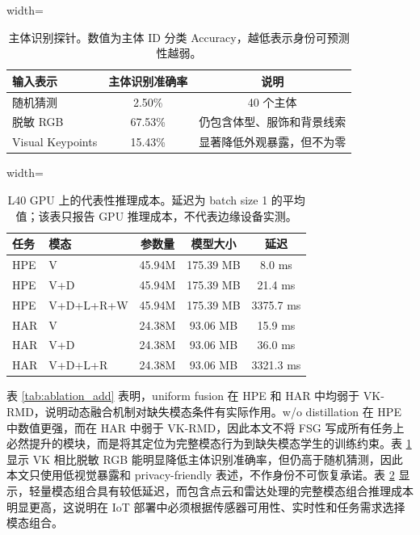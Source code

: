 \documentclass[journal]{IEEEtran}
\begin{document}
\begin{table}[!t]
\centering
\caption{主体识别探针。数值为主体 ID 分类 Accuracy，越低表示身份可预测性越弱。}
\label{tab:privacy_add}
\scriptsize
\begin{adjustbox}{width=\linewidth}
\begin{tabular}{lcc}
\toprule
输入表示 & 主体识别准确率 & 说明 \\
\midrule
随机猜测 & 2.50\% & 40 个主体 \\
脱敏 RGB & 67.53\% & 仍包含体型、服饰和背景线索 \\
Visual Keypoints & 15.43\% & 显著降低外观暴露，但不为零 \\
\bottomrule
\end{tabular}
\end{adjustbox}
\end{table}

\begin{table}[!t]
\centering
\caption{L40 GPU 上的代表性推理成本。延迟为 batch size 1 的平均值；该表只报告 GPU 推理成本，不代表边缘设备实测。}
\label{tab:iot_add}
\scriptsize
\begin{adjustbox}{width=\linewidth}
\begin{tabular}{llccc}
\toprule
任务 & 模态 & 参数量 & 模型大小 & 延迟 \\
\midrule
HPE & V & 45.94M & 175.39 MB & 8.0 ms \\
HPE & V+D & 45.94M & 175.39 MB & 21.4 ms \\
HPE & V+D+L+R+W & 45.94M & 175.39 MB & 3375.7 ms \\
HAR & V & 24.38M & 93.06 MB & 15.9 ms \\
HAR & V+D & 24.38M & 93.06 MB & 36.0 ms \\
HAR & V+D+L+R & 24.38M & 93.06 MB & 3321.3 ms \\
\bottomrule
\end{tabular}
\end{adjustbox}
\end{table}

表 \ref{tab:ablation_add} 表明，uniform fusion 在 HPE 和 HAR 中均弱于 VK-RMD，说明动态融合机制对缺失模态条件有实际作用。w/o distillation 在 HPE 中数值更强，而在 HAR 中弱于 VK-RMD，因此本文不将 FSG 写成所有任务上必然提升的模块，而是将其定位为完整模态行为到缺失模态学生的训练约束。表 \ref{tab:privacy_add} 显示 VK 相比脱敏 RGB 能明显降低主体识别准确率，但仍高于随机猜测，因此本文只使用低视觉暴露和 privacy-friendly 表述，不作身份不可恢复承诺。表 \ref{tab:iot_add} 显示，轻量模态组合具有较低延迟，而包含点云和雷达处理的完整模态组合推理成本明显更高，这说明在 IoT 部署中必须根据传感器可用性、实时性和任务需求选择模态组合。
\end{document}
